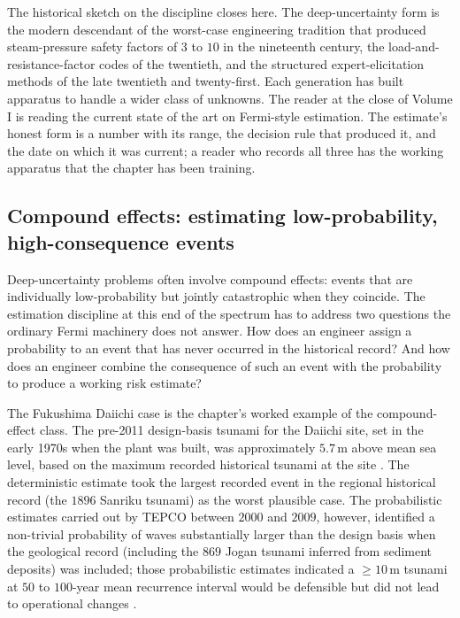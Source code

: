The historical sketch on the discipline closes here. The
deep-uncertainty form is the modern descendant of the worst-case
engineering tradition that produced steam-pressure safety
factors of $3$ to $10$ in the nineteenth century, the load-and-
resistance-factor codes of the twentieth, and the structured
expert-elicitation methods of the late twentieth and twenty-first.
Each generation has built apparatus to handle a wider class of
unknowns. The reader at the close of Volume I is reading the
current state of the art on Fermi-style estimation. The estimate's
honest form is a number with its range, the decision rule that
produced it, and the date on which it was current; a reader who
records all three has the working apparatus that the chapter has
been training.

\subsection{Compound effects: estimating low-probability,
high-consequence events}

Deep-uncertainty problems often involve compound effects: events
that are individually low-probability but jointly catastrophic when
they coincide. The estimation discipline at this end of the
spectrum has to address two questions the ordinary Fermi machinery
does not answer. How does an engineer assign a probability to an
event that has never occurred in the historical record? And how
does an engineer combine the consequence of such an event with the
probability to produce a working risk estimate?

The Fukushima Daiichi case is the chapter's worked example of the
compound-effect class. The pre-2011 design-basis tsunami for the
Daiichi site, set in the early 1970s when the plant was built,
was approximately $5.7 \,\si{\meter}$ above mean sea level, based
on the maximum recorded historical tsunami at the site
\cite{paper:ch09t3-toda-tsuruoka-2012}. The deterministic estimate
took the largest recorded event in the regional historical record
(the $1896$ Sanriku tsunami) as the worst plausible case. The
probabilistic estimates carried out by TEPCO between $2000$ and
$2009$, however, identified a non-trivial probability of waves
substantially larger than the design basis when the geological
record (including the $869$ Jogan tsunami inferred from sediment
deposits) was included; those probabilistic estimates indicated a
$\geq 10 \,\si{\meter}$ tsunami at $50$ to $100$-year mean
recurrence interval would be defensible but did not lead to
operational changes \cite{acc:tepco-fukushima-2012,
paper:ch09t3-toda-tsuruoka-2012}.

